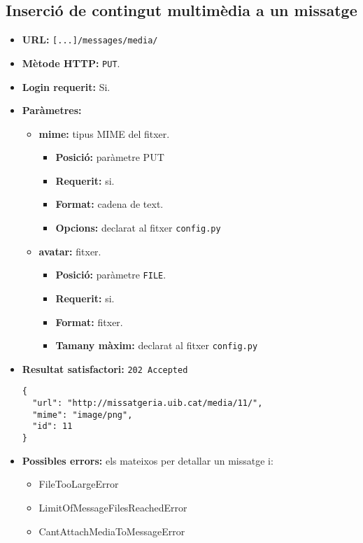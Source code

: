 \subsection{Inserció de contingut multimèdia a un missatge}
\begin{itemize}
\item \textbf{\ac{URL}:} \verb$[...]/messages/media/$
\item \textbf{Mètode \ac{HTTP}: } \texttt{PUT}.
\item \textbf{Login requerit:} Si.
\item \textbf{Paràmetres:}
	\begin{itemize}
		\item \textbf{mime:} tipus \ac{MIME} del fitxer.
		\begin{itemize}
			\item \textbf{Posició:} paràmetre \ac{PUT}
			\item \textbf{Requerit:} si.
			\item \textbf{Format:} cadena de text.
			\item \textbf{Opcions:} declarat al fitxer \texttt{config.py}
		\end{itemize}
		\item \textbf{avatar:} fitxer.
		\begin{itemize}
			\item \textbf{Posició:} paràmetre \texttt{FILE}.
			\item \textbf{Requerit:} si.
			\item \textbf{Format:} fitxer.
			\item \textbf{Tamany màxim:} declarat al fitxer \texttt{config.py}
		\end{itemize}
	\end{itemize}
	\item \textbf{Resultat satisfactori:} \texttt{202 Accepted}
	\begin{verbatim}
{
  "url": "http://missatgeria.uib.cat/media/11/",
  "mime": "image/png",
  "id": 11
}
	\end{verbatim}
	
	\item \textbf{Possibles errors:} els mateixos per detallar un missatge i:
	\begin{itemize}
		\item FileTooLargeError
		\item LimitOfMessageFilesReachedError
		\item CantAttachMediaToMessageError
	\end{itemize}
\end{itemize}


